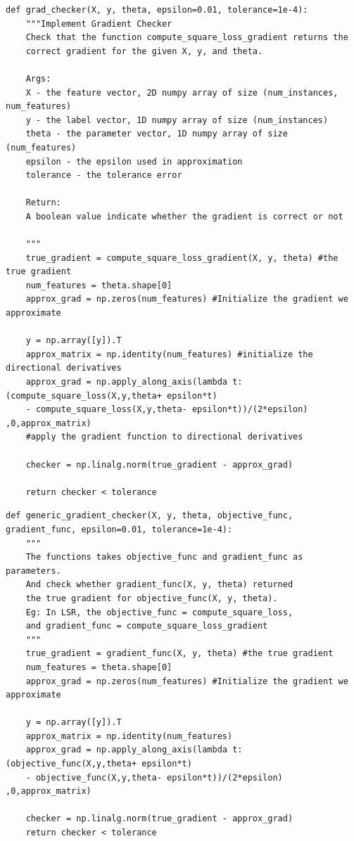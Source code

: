 \documentclass{article}
\newenvironment{problem}[2][$\bullet$]{\begin{trivlist}\large
		\item[\hskip \labelsep {\bfseries #1}\hskip \labelsep {\bfseries #2.}]}  {\end{trivlist}}
\newenvironment{sub}[2][$-$]{\begin{trivlist}
		\item[\hskip \labelsep {\bfseries #1}\hskip \labelsep {\bfseries #2.}]}  {\end{trivlist}}
\begin{document}
\begin{problem}{2.3 Gradient Checker}
\end{problem}

\begin{sub}{2.3.1}
\end{sub}

\begin{verbatim}
def grad_checker(X, y, theta, epsilon=0.01, tolerance=1e-4): 
	"""Implement Gradient Checker
	Check that the function compute_square_loss_gradient returns the
	correct gradient for the given X, y, and theta.
	
	Args:
	X - the feature vector, 2D numpy array of size (num_instances, num_features)
	y - the label vector, 1D numpy array of size (num_instances)
	theta - the parameter vector, 1D numpy array of size (num_features)
	epsilon - the epsilon used in approximation
	tolerance - the tolerance error
	
	Return:
	A boolean value indicate whether the gradient is correct or not
	
	"""
	true_gradient = compute_square_loss_gradient(X, y, theta) #the true gradient
	num_features = theta.shape[0]
	approx_grad = np.zeros(num_features) #Initialize the gradient we approximate
	
	y = np.array([y]).T
	approx_matrix = np.identity(num_features) #initialize the directional derivatives
	approx_grad = np.apply_along_axis(lambda t:(compute_square_loss(X,y,theta+ epsilon*t) 
	- compute_square_loss(X,y,theta- epsilon*t))/(2*epsilon) ,0,approx_matrix) 
	#apply the gradient function to directional derivatives 
	
	checker = np.linalg.norm(true_gradient - approx_grad)
	
	return checker < tolerance

\end{verbatim}

\begin{sub}{2.3.2}
\end{sub}
\begin{verbatim}
def generic_gradient_checker(X, y, theta, objective_func,
gradient_func, epsilon=0.01, tolerance=1e-4):
	"""
	The functions takes objective_func and gradient_func as parameters.
	And check whether gradient_func(X, y, theta) returned
	the true gradient for objective_func(X, y, theta).
	Eg: In LSR, the objective_func = compute_square_loss,
	and gradient_func = compute_square_loss_gradient
	"""
	true_gradient = gradient_func(X, y, theta) #the true gradient
	num_features = theta.shape[0]
	approx_grad = np.zeros(num_features) #Initialize the gradient we approximate
	
	y = np.array([y]).T
	approx_matrix = np.identity(num_features)
	approx_grad = np.apply_along_axis(lambda t: (objective_func(X,y,theta+ epsilon*t)
	- objective_func(X,y,theta- epsilon*t))/(2*epsilon) ,0,approx_matrix)
	
	checker = np.linalg.norm(true_gradient - approx_grad)
	return checker < tolerance

\end{verbatim}
\end{document}
